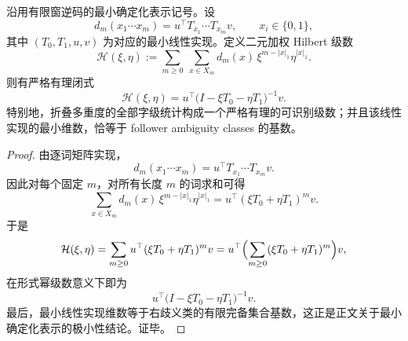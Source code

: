 \begin{theorem}\label{thm:conclusion-fold-inversecode-hilbert-recognizable}
沿用有限窗逆码的最小确定化表示记号。设
\[
d_m(x_1\cdots x_m)=u^\top T_{x_1}\cdots T_{x_m}v,
\qquad
x_i\in\{0,1\},
\]
其中 \((T_0,T_1,u,v)\) 为对应的最小线性实现。定义二元加权 Hilbert 级数
\[
\mathcal H(\xi,\eta)
:=
\sum_{m\ge 0}\ \sum_{x\in X_m}
d_m(x)\,\xi^{m-|x|_1}\eta^{|x|_1}.
\]
则有严格有理闭式
\[
\boxed{\;
\mathcal H(\xi,\eta)
=
u^\top\bigl(I-\xi T_0-\eta T_1\bigr)^{-1}v.\;}
\]
特别地，折叠多重度的全部字级统计构成一个严格有理的可识别级数；并且该线性实现的最小维数，恰等于 follower ambiguity classes 的基数。
\end{theorem}
\begin{proof}
由逐词矩阵实现，
\[
d_m(x_1\cdots x_m)=u^\top T_{x_1}\cdots T_{x_m}v.
\]
因此对每个固定 \(m\)，对所有长度 \(m\) 的词求和可得
\[
\sum_{x\in X_m}d_m(x)\,\xi^{m-|x|_1}\eta^{|x|_1}
=
u^\top(\xi T_0+\eta T_1)^m v.
\]
于是
\[
\mathcal H(\xi,\eta)
=
\sum_{m\ge0}u^\top(\xi T_0+\eta T_1)^m v
=
u^\top\Bigl(\sum_{m\ge0}(\xi T_0+\eta T_1)^m\Bigr)v,
\]
在形式幂级数意义下即为
\[
u^\top\bigl(I-\xi T_0-\eta T_1\bigr)^{-1}v.
\]
最后，最小线性实现维数等于右歧义类的有限完备集合基数，这正是正文关于最小确定化表示的极小性结论。证毕。
\end{proof}

